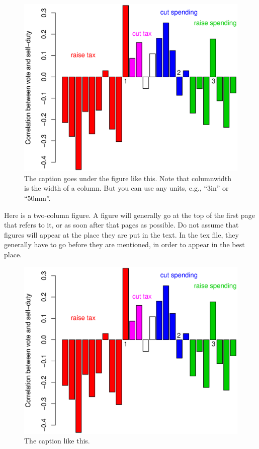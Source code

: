 \documentclass[twocolumn]{article}
\begin{document}
\begin{figure}[t!]
\includegraphics[width=\columnwidth]{dut11.eps}
\caption{The caption goes under the figure like this. Note that
  columnwidth is the width of a column. But you can use any units,
  e.g., ``3in'' or ``50mm''.}
\end{figure}

Here is a two-column figure. A figure will generally go at the top of
the first page that refers to it, or as soon after that pages as
possible. Do not assume that figures will appear at the place they are
put in the text. In the tex file, they generally have to go before
they are mentioned, in order to appear in the best place.

\begin{figure}[t!]\centering
\includegraphics[width=5in]{dut11.eps}
\caption{The caption like this.}
\end{figure}
\end{document}
